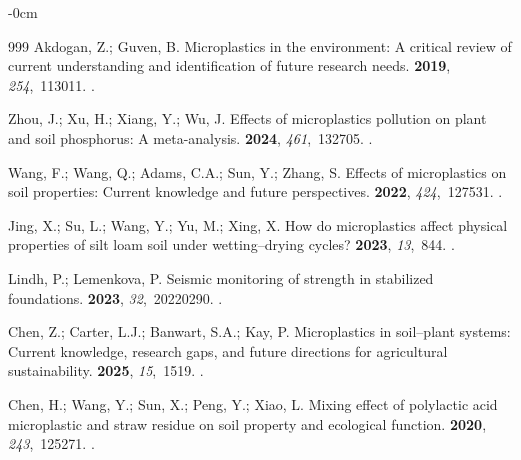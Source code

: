 \documentclass[environremediat,article,accept,pdftex,oneauthor]{Definitions/mdpi}
\begin{document}
\begin{adjustwidth}{-\extralength}{0cm}
\begin{thebibliography}{999}
Akdogan, Z.; Guven, B.
\newblock Microplastics in the environment: A critical review of current
  understanding and identification of future research needs.
 {\bf 2019}, {\em 254},~113011.
.

Zhou, J.; Xu, H.; Xiang, Y.; Wu, J.
\newblock Effects of microplastics pollution on plant and soil phosphorus: A
  meta-analysis.
 {\bf 2024}, {\em 461},~132705.
.

Wang, F.; Wang, Q.; Adams, C.A.; Sun, Y.; Zhang, S.
\newblock Effects of microplastics on soil properties: Current knowledge and
  future perspectives.
 {\bf 2022}, {\em 424},~127531.
.

Jing, X.; Su, L.; Wang, Y.; Yu, M.; Xing, X.
\newblock How do microplastics affect physical properties of silt loam soil
  under wetting--drying cycles?
 {\bf 2023}, {\em 13},~844.
.

Lindh, P.; Lemenkova, P.
\newblock Seismic monitoring of strength in stabilized foundations.
 {\bf 2023},
  {\em 32},~20220290.
.

Chen, Z.; Carter, L.J.; Banwart, S.A.; Kay, P.
\newblock Microplastics in soil--plant systems: Current knowledge, research
  gaps, and future directions for agricultural sustainability.
 {\bf 2025}, {\em 15},~1519.
.

Chen, H.; Wang, Y.; Sun, X.; Peng, Y.; Xiao, L.
\newblock Mixing effect of polylactic acid microplastic and straw residue on
  soil property and ecological function.
 {\bf 2020}, {\em 243},~125271.
.


\end{thebibliography}
\end{adjustwidth}
\end{document}
